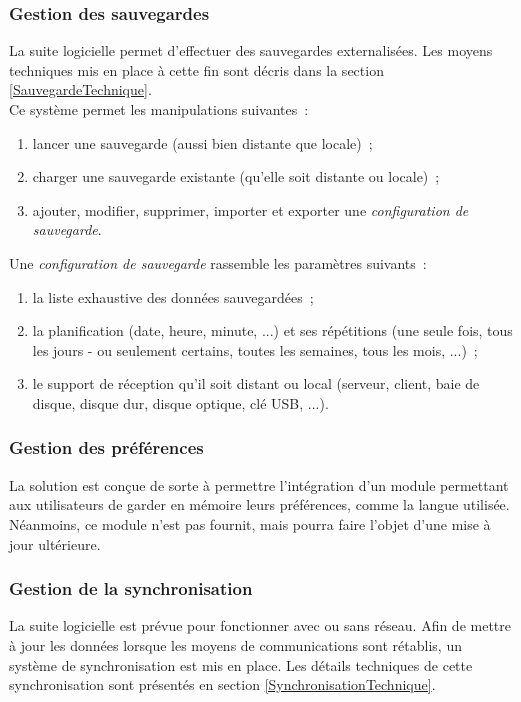 \subsubsection{Gestion des sauvegardes}
La suite logicielle permet d'effectuer des sauvegardes externalisées. Les moyens techniques mis en place à cette fin sont décris dans la section \ref{SauvegardeTechnique}.
\\
Ce système permet les manipulations suivantes~:
\begin{enumerate}
	\item lancer une sauvegarde (aussi bien distante que locale)~;
	\item charger une sauvegarde existante (qu'elle soit distante ou locale)~;
	\item ajouter, modifier, supprimer, importer et exporter une \emph{configuration de sauvegarde}.
\end{enumerate}
Une \emph{configuration de sauvegarde} rassemble les paramètres suivants~:
\begin{enumerate}
	\item la liste exhaustive des données sauvegardées~;
	\item la planification (date, heure, minute, ...) et ses répétitions (une seule fois, tous les jours - ou seulement certains, toutes les semaines, tous les mois, ...)~;
	\item le support de réception qu'il soit distant ou local (serveur, client, baie de disque, disque dur, disque optique, clé USB, ...).
\end{enumerate}

\subsubsection{Gestion des préférences}
La solution est conçue de sorte à permettre l'intégration d'un module permettant aux utilisateurs de garder en mémoire leurs préférences, comme la langue utilisée. Néanmoins, ce module n'est pas fournit, mais pourra faire l'objet d'une mise à jour ultérieure.

\subsubsection{Gestion de la synchronisation}
La suite logicielle est prévue pour fonctionner avec ou sans réseau. Afin de mettre à jour les données lorsque les moyens de communications sont rétablis, un système de synchronisation est mis en place. Les détails techniques de cette synchronisation sont présentés en section \ref{SynchronisationTechnique}.

